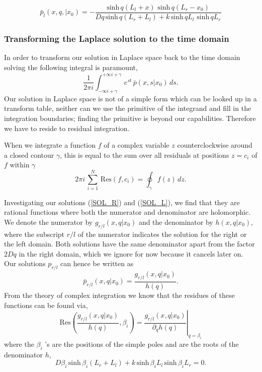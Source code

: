 \begin{equation}
 \bar{p}_l(x,q,|x_0) = -\frac{\mathrm{sinh} \, q(L_l + x) \,\, \mathrm{sinh} \, q(L_r - x_0)}{Dq \, \mathrm{sinh} \, q(L_r + L_l) + k \, \mathrm{sinh} \, q L_l \,\, \mathrm{sinh} \, q L_r}
\label{SOL_L}
\end{equation}

\subsubsection{Transforming the Laplace solution to the time domain}

In order to transform our solution in Laplace space back to the time domain solving the following integral is paramount,
\begin{equation}
 \frac{1}{2 \pi i} \int_{-\infty i + \gamma}^{+\infty i + \gamma} \, e^{s t} \, \bar{p}(x,s|x_0) \, ds.
 \label{INT_I}
\end{equation}
Our solution in Laplace space is not of a simple form which can be looked up in a transform table, neither can we use the primitive of the integrand and fill in the integration boundaries; finding the primitive is beyond our capabilities. Therefore we have to reside to residual integration. 

When we integrate a function $f$ of a complex variable $z$ counterclockwise around a closed contour $\gamma$, this is equal to the sum over all residuals at positions $z = c_i$ of $f$ within $\gamma$
\begin{equation}
 2 \pi i\,\sum_{i=1}^{N}\,\mathrm{Res}(f,c_i) = \oint_\gamma f(z)\,dz.
 \label{RES_I}
\end{equation}

Investigating our solutions (\ref{SOL_R}) and (\ref{SOL_L}), we find that they are rational functions where both the numerator and denominator are holomorphic. We denote the numerator by $g_{r/l}(x,q|x_0)$ and the denominator by $h(x,q|x_0)$, where the subscript $r/l$ of the numerator indicates the solution for the right or the left domain. Both solutions have the same denominator apart from the factor $2 D q$ in the right domain, which we ignore for now because it cancels later on. Our solutions $p_{r/l}$ can hence be written as
\begin{equation} 
 \bar{p}_{r/l}(x,q|x_0) = \frac{g_{r/l}(x,q|x_0)}{h(q)}.
\end{equation}
From the theory of complex integration we know that the residues of these functions can be found via,
\begin{equation} 
 \mathrm{Res} \left( \frac{g_{r/l}(x,q|x_0)}{h(q)},\beta_i \right) = \left. \frac{g_{r/l}(x,q|x_0)}{\partial_q h(q)} \right|_{q = \beta_i}
 \label{RES_II}
\end{equation}
where the $\beta_i$ 's are the positions of the simple poles and are the roots of the denominator $h$,
\begin{equation} 
 D\beta_i \, \mathrm{sinh} \, \beta_i (L_r + L_l) + k \, \mathrm{sinh} \, \beta_i L_l \, \mathrm{sinh} \, \beta_i L_r = 0.
 \label{ROOT_I}
\end{equation}

